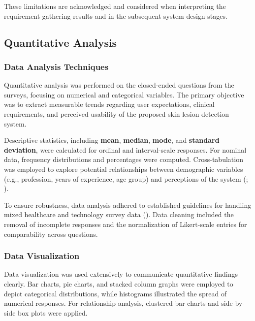 \documentclass[
  12pt,
  oneside]{article}
\begin{document}
These limitations are acknowledged and considered when interpreting the
requirement gathering results and in the subsequent system design
stages.

\subsection{Quantitative Analysis}\label{quantitative-analysis}

\subsubsection{Data Analysis Techniques}\label{data-analysis-techniques}

Quantitative analysis was performed on the closed-ended questions from
the surveys, focusing on numerical and categorical variables. The
primary objective was to extract measurable trends regarding user
expectations, clinical requirements, and perceived usability of the
proposed skin lesion detection system.

Descriptive statistics, including \textbf{mean}, \textbf{median},
\textbf{mode}, and \textbf{standard deviation}, were calculated for
ordinal and interval-scale responses. For nominal data, frequency
distributions and percentages were computed. Cross-tabulation was
employed to explore potential relationships between demographic
variables (e.g., profession, years of experience, age group) and
perceptions of the system (;
).

To ensure robustness, data analysis adhered to established guidelines
for handling mixed healthcare and technology survey data
(). Data cleaning
included the removal of incomplete responses and the normalization of
Likert-scale entries for comparability across questions.

\subsubsection{Data Visualization}\label{data-visualization}

Data visualization was used extensively to communicate quantitative
findings clearly. Bar charts, pie charts, and stacked column graphs were
employed to depict categorical distributions, while histograms
illustrated the spread of numerical responses. For relationship
analysis, clustered bar charts and side-by-side box plots were applied.
\end{document}
